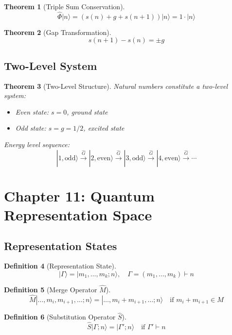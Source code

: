 \documentclass[12pt]{article}
\newtheorem{theorem}{Theorem}[section]
\theoremstyle{definition}
\newtheorem{definition}[theorem]{Definition}
\begin{document}
\begin{theorem}[Triple Sum Conservation]
\[
\hat{\Phi}|n\rangle = (s(n) + g + s(n+1))|n\rangle = 1 \cdot |n\rangle
\]
\end{theorem}

\begin{theorem}[Gap Transformation]
\[
s(n+1) - s(n) = \pm g
\]
\end{theorem}

\subsection{Two-Level System}

\begin{theorem}[Two-Level Structure]
Natural numbers constitute a two-level system:
\begin{itemize}
    \item Even state: \(s=0\), ground state
    \item Odd state: \(s=g=1/2\), excited state
\end{itemize}
Energy level sequence:
\[
|1,\text{odd}\rangle \xrightarrow{\hat{G}} |2,\text{even}\rangle \xrightarrow{\hat{G}} |3,\text{odd}\rangle \xrightarrow{\hat{G}} |4,\text{even}\rangle \xrightarrow{\hat{G}} \cdots
\]
\end{theorem}

\section{Chapter 11: Quantum Representation Space}

\subsection{Representation States}

\begin{definition}[Representation State]
\[
|\Gamma\rangle = |m_1,\dots,m_k;n\rangle,\quad \Gamma = (m_1,\dots,m_k) \vdash n
\]
\end{definition}

\begin{definition}[Merge Operator \(\hat{M}\)]
\[
\hat{M}|\dots,m_i,m_{i+1},\dots;n\rangle = |\dots,m_i+m_{i+1},\dots;n\rangle \quad \text{if } m_i+m_{i+1} \in M
\]
\end{definition}

\begin{definition}[Substitution Operator \(\hat{S}\)]
\[
\hat{S}|\Gamma;n\rangle = |\Gamma';n\rangle \quad \text{if } \Gamma' \vdash n
\]
\end{definition}
\end{document}
